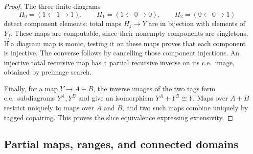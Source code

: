 \documentclass[11pt]{article}
\begin{document}
\begin{proof}
The three finite diagrams
\[
 H_0=(1\leftarrow1\to1),\qquad
 H_1=(1\leftarrow0\to0),\qquad
 H_2=(0\leftarrow0\to1)
\]
detect component elements: total maps $H_j\to Y$ are in bijection
with elements of $Y_j$. These maps are computable, since their
nonempty components are singletons. If a diagram map is monic,
testing it on these maps proves that each component is injective.
The converse follows by cancelling those component injections.
An injective total recursive map has a partial recursive inverse
on its c.e.\ image, obtained by preimage search.

Finally, for a map $Y\to A+B$, the inverse images of the two
tags form c.e.\ subdiagrams $Y^A,Y^B$ and give an isomorphism
$Y^A+Y^B\cong Y$. Maps over $A+B$ restrict uniquely to maps
over $A$ and $B$, and two such maps combine uniquely by tagged
copairing. This proves the slice equivalence expressing extensivity.
\end{proof}

\subsection{Partial maps, ranges, and connected domains}
\end{document}
